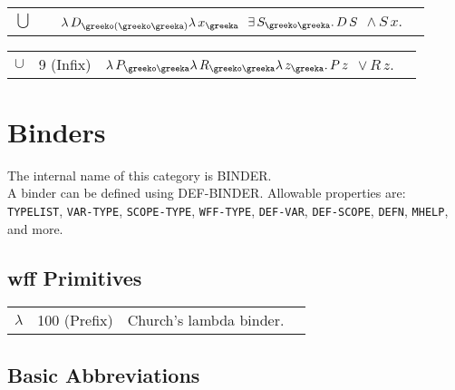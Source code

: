 \begin{description}
\item[SETUNION]  \begin{tabular}{l l l l}
\texttt{$\bigcup$}&&\texttt{$ \lambda \,D_{\greeko(\greeko\greeka)} \lambda \,x_{\greeka} $ $\exists \,S_{\greeko\greeka} . \,D \,S $ $\land \,S \,x$}. \\ 
\end{tabular}

\item[UNION]  \begin{tabular}{l l l l}
\texttt{$\cup$}&9 (Infix)&\texttt{$ \lambda \,P_{\greeko\greeka} \lambda \,R_{\greeko\greeka} \lambda \,z_{\greeka} . \,P \,z $ $\lor \,R \,z$}. \\ 
\end{tabular}
\item
\end{description}
\chapter{Binders}
The internal name of this category is 
BINDER.\\
A binder can be defined using DEF-BINDER.
Allowable properties are: \texttt{TYPELIST}, \texttt{VAR-TYPE}, \texttt{SCOPE-TYPE}, \texttt{WFF-TYPE}, \texttt{DEF-VAR}, \texttt{DEF-SCOPE}, \texttt{DEFN}, \texttt{MHELP}, and more.

\section{wff Primitives}

\begin{description} 
\item[LAMBDA]  \begin{tabular}{l l l l}
\texttt{$\lambda$}&100 (Prefix)&
Church's lambda binder.
\end{tabular}
\item
\end{description}

\section{Basic Abbreviations}


